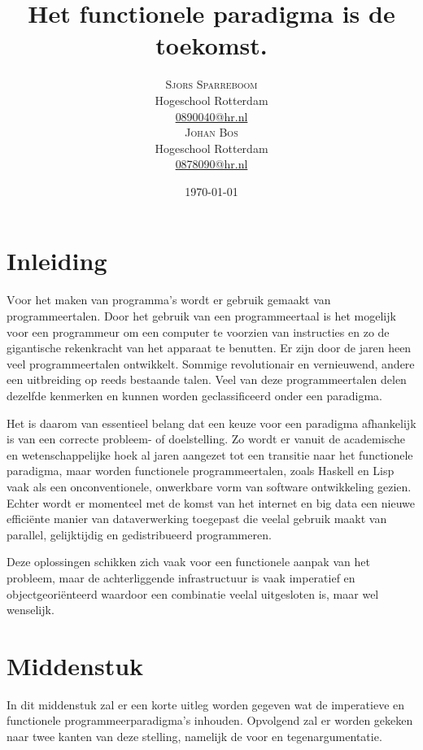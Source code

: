 \documentclass[twoside,twocolumn]{article}
\title{Het functionele paradigma is de toekomst.} %
\author{%
  \textsc{Sjors Sparreboom} \\[1ex] %
\normalsize Hogeschool Rotterdam \\ %
\normalsize \href{mailto:0890040@hr.nl}{0890040@hr.nl} \\[2ex] %
\textsc{Johan Bos} \\[1ex] %
\normalsize Hogeschool Rotterdam \\ %
\normalsize \href{mailto:0878090@hr.nl}{0878090@hr.nl} %
}
\date{\today} %
\begin{document}
\nocite{*}

\maketitle


\section{Inleiding}
\lettrine[nindent=0em,lines=3]{V}oor het maken van programma's wordt er gebruik
gemaakt van programmeertalen. Door het gebruik van een programmeertaal is het
mogelijk voor een programmeur om een computer te voorzien van instructies en zo
de gigantische rekenkracht van het apparaat te benutten. Er zijn door de jaren
heen veel programmeertalen ontwikkelt. Sommige revolutionair en vernieuwend,
andere een uitbreiding op reeds bestaande talen. Veel van deze programmeertalen
delen dezelfde kenmerken en kunnen worden geclassificeerd onder een
paradigma.

Het is daarom van essentieel belang dat een keuze voor een paradigma
afhankelijk is van een correcte probleem- of doelstelling. Zo wordt er vanuit
de academische en wetenschappelijke hoek al jaren aangezet tot een transitie
naar het functionele paradigma, maar worden functionele programmeertalen, zoals
Haskell en Lisp vaak als een onconventionele, onwerkbare vorm van software
ontwikkeling gezien. Echter wordt er momenteel met de komst van het internet en
big data een nieuwe effici\"ente manier van dataverwerking toegepast die
veelal gebruik maakt van parallel, gelijktijdig en gedistribueerd programmeren.

Deze oplossingen schikken zich vaak voor een functionele aanpak van het
probleem, maar de achterliggende infrastructuur is vaak imperatief en
objectgeori\"enteerd waardoor een combinatie veelal uitgesloten is, maar wel
wenselijk.


\section{Middenstuk}

In dit middenstuk zal er een korte uitleg worden gegeven wat de imperatieve en
functionele programmeerparadigma's inhouden. Opvolgend zal er worden gekeken
naar twee kanten van deze stelling, namelijk de voor en tegenargumentatie.
\end{document}
